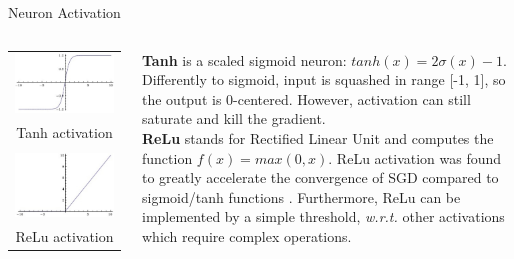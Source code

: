 \documentclass[aspectratio=169]{beamer}
\begin{document}
\begin{frame}{Neuron Activation}
\begin{columns}
\begin{column}{0.25\textwidth}
\begin{tabular}{c}
\\
\includegraphics[width=\textwidth]{img/cnn/act_tanh.jpg}\\
Tanh activation\\
\\
\includegraphics[width=\textwidth]{img/cnn/act_relu.jpg}\\
ReLu activation
\end{tabular}
\end{column}
\begin{column}{0.7\textwidth}
\textbf{Tanh} is a scaled sigmoid neuron: $tanh(x)=2\sigma(x)-1$. Differently to sigmoid, input is squashed in range [-1, 1], so the output is 0-centered. However, activation can still saturate and kill the gradient.\\
\vspace{0.5cm}
\textbf{ReLu} stands for Rectified Linear Unit and computes the function $f(x) = max(0, x)$. ReLu activation was found to greatly accelerate the convergence of SGD compared to sigmoid/tanh functions \cite{krizhevsky2012imagenet}. Furthermore, ReLu can be implemented by a simple threshold, \emph{w.r.t.} other activations which require complex operations.
\end{column}
\end{columns}
\end{frame}
\end{document}
